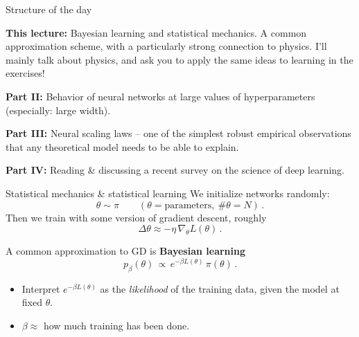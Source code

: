 \documentclass[11pt]{beamer}
\newcommand{\hl}[1]{{\color{blue!60!black}\textbf{#1}}}
\begin{document}
\begin{frame}{Structure of the day}

\hl{This lecture:} Bayesian learning and statistical mechanics. A common approximation scheme, with a particularly strong connection to physics. I'll mainly talk about physics, and ask you to apply the same ideas to learning in the exercises! \pause

\medskip

\hl{Part II:} Behavior of neural networks at large values of hyperparameters (especially: large width).  \pause

\medskip

\hl{Part III:} Neural scaling laws -- one of the simplest robust empirical observations that any theoretical model needs to be able to explain. \pause

\medskip

\hl{Part IV:}  Reading \& discussing a recent survey on the science of deep learning.
\end{frame}



\begin{frame}{Statistical mechanics \& statistical learning}
  We initialize networks randomly:
  \[ \theta \sim \pi \qquad (\theta = \text{parameters},\ \#\theta = N)\,. \]  \pause
  Then we train with some version of gradient descent, roughly
  \[ \Delta\theta \approx -\eta\, \nabla_\theta L(\theta)\,. \]  \pause
  \vspace{1mm}

  A common approximation to GD is \hl{Bayesian learning}
  \[ p_\beta(\theta) \,\propto\, e^{-\beta L(\theta)}\, \pi(\theta)\,. \]
  \vspace{-.6cm}
  \begin{itemize}
    \item Interpret $e^{-\beta L(\theta)}$ as the \emph{likelihood} of the
      training data, given the model at fixed $\theta$.
    \item $\beta \approx$ how much training has been done.
  \end{itemize}
\end{frame}
\end{document}
